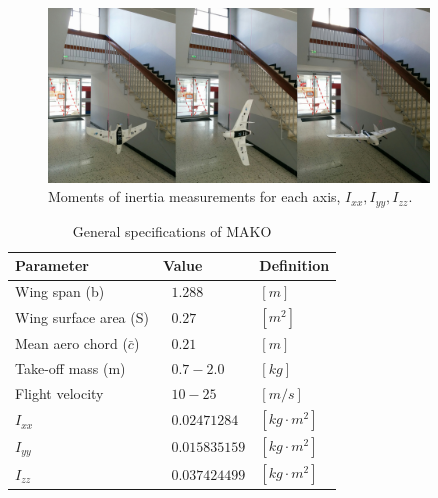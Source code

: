  \begin{figure}
      \centering
      \includegraphics[width=0.9\textwidth]{figures/Mako_Inertia_combined_small.png}
      \caption{Moments of inertia measurements for each axis, $I_{xx} , I_{yy} , I_{zz} $.}
      \label{fig:inertia}
 \end{figure}
 
 \begin{table}
\caption{General specifications of MAKO \cite{bronz2016aerodynamic}}
\label{arm:MAKO}
\begin{center}
\begin{tabular}{ ||p{4cm}|p{3cm}|p{2cm}||}\hline
\textbf{Parameter} & \textbf{Value} & \textbf{Definition} \\\hline
Wing span (b)                  & $\ \ \, 1.288 $	   & $[m]$ \\\hline
Wing surface area (S)      & $ \ \ \, 0.27 $           &  $[m^2]$ \\\hline
Mean aero chord ($\bar{c}$)         & $\ \ \, 0.21$           & $[m]$ \\\hline
Take-off mass (m)             & $\ \ \, 0.7 - 2.0$       & $[kg]$ \\\hline
Flight velocity           & $\ \ \, 10 - 25$       & $[m/s]$ \\\hline
$I_{xx}$                         & $\ \ \, 0.02471284$   & $[kg \cdot m^2]$ \\\hline
$I_{yy}$                         & $\ \ \, 0.015835159$   & $[kg \cdot m^2]$ \\\hline
$I_{zz}$                         & $\ \ \, 0.037424499$   & $[kg \cdot m^2]$ \\\hline
\end{tabular}
\end{center}
\end{table}


